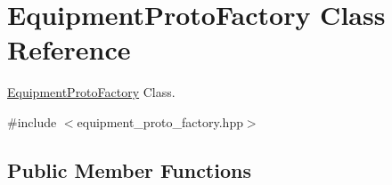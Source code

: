 \hypertarget{class_equipment_proto_factory}{}\section{Equipment\+Proto\+Factory Class Reference}
\label{class_equipment_proto_factory}


\hyperlink{class_equipment_proto_factory}{Equipment\+Proto\+Factory} Class.  




{\ttfamily \#include $<$equipment\+\_\+proto\+\_\+factory.\+hpp$>$}

\subsection*{Public Member Functions}
